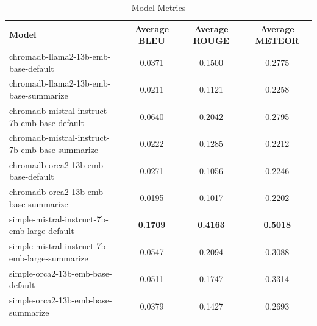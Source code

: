 \documentclass[conference, 11pt]{IEEEtran}
\begin{document}
\begin{table}[h]
\caption{Model Metrics}
\centering
\begin{tabular}{|l|c|c|c|}
\hline
\textbf{Model} & \textbf{Average BLEU} & \textbf{Average ROUGE} & \textbf{Average METEOR} \\
\hline
chromadb-llama2-13b-emb-base-default & 0.0371 & 0.1500 & 0.2775 \\
chromadb-llama2-13b-emb-base-summarize & 0.0211 & 0.1121 & 0.2258 \\
chromadb-mistral-instruct-7b-emb-base-default & 0.0640 & 0.2042 & 0.2795 \\
chromadb-mistral-instruct-7b-emb-base-summarize & 0.0222 & 0.1285 & 0.2212 \\
chromadb-orca2-13b-emb-base-default & 0.0271 & 0.1056 & 0.2246 \\
chromadb-orca2-13b-emb-base-summarize & 0.0195 & 0.1017 & 0.2202 \\
simple-mistral-instruct-7b-emb-large-default & \textbf{0.1709} & \textbf{0.4163} & \textbf{0.5018} \\
simple-mistral-instruct-7b-emb-large-summarize & 0.0547 & 0.2094 & 0.3088 \\
simple-orca2-13b-emb-base-default & 0.0511 & 0.1747 & 0.3314 \\
simple-orca2-13b-emb-base-summarize & 0.0379 & 0.1427 & 0.2693 \\
\hline
\end{tabular}
\label{tab:model_metrics_sorted_updated}
\end{table}
\end{document}

